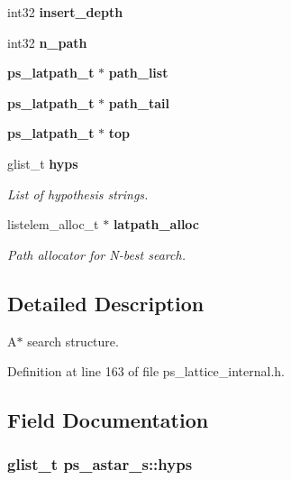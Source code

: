 \begin{DoxyCompactItemize}
\item 
int32 {\bfseries insert\-\_\-depth}\label{structps__astar__s_a50798b1396b3f565b2584ffeb1245b5d}

\item 
int32 {\bfseries n\-\_\-path}\label{structps__astar__s_a12ba7d143c867b1f1e55dfdfae3e6236}

\item 
{\bf ps\-\_\-latpath\-\_\-t} $\ast$ {\bfseries path\-\_\-list}\label{structps__astar__s_a4474da488f4e1545d395c65c39679b8c}

\item 
{\bf ps\-\_\-latpath\-\_\-t} $\ast$ {\bfseries path\-\_\-tail}\label{structps__astar__s_abbfec3e490a6bfd56b75ec419ad9f058}

\item 
{\bf ps\-\_\-latpath\-\_\-t} $\ast$ {\bfseries top}\label{structps__astar__s_aa995e464c2df2594824602e55afb25a8}

\item 
glist\-\_\-t {\bf hyps}
\begin{DoxyCompactList}\small\item\em List of hypothesis strings. \end{DoxyCompactList}\item 
listelem\-\_\-alloc\-\_\-t $\ast$ {\bf latpath\-\_\-alloc}
\begin{DoxyCompactList}\small\item\em Path allocator for N-\/best search. \end{DoxyCompactList}\end{DoxyCompactItemize}


\subsection{Detailed Description}
A$\ast$ search structure. 

Definition at line 163 of file ps\-\_\-lattice\-\_\-internal.\-h.



\subsection{Field Documentation}
\subsubsection[{hyps}]{\setlength{\rightskip}{0pt plus 5cm}glist\-\_\-t ps\-\_\-astar\-\_\-s\-::hyps}\label{structps__astar__s_ace603617a74a81575519ae1bb94720c4}


